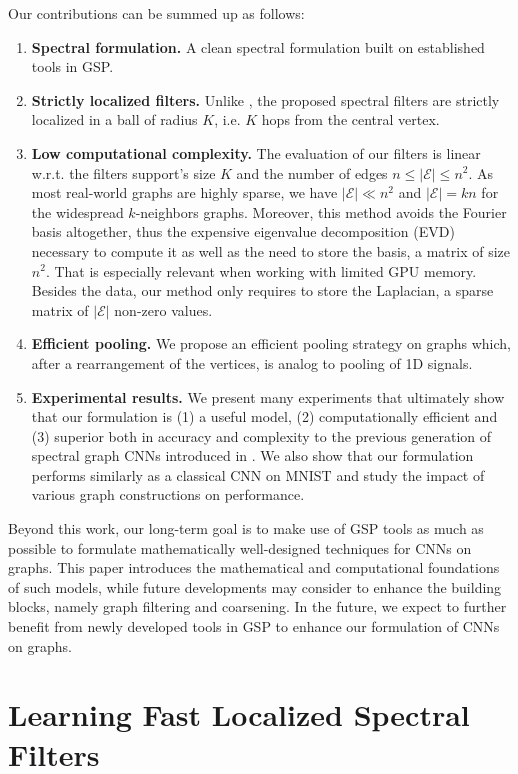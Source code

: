 \documentclass{article}
\newcommand{\E}{\mathcal{E}}
\newcommand{\bruna}{art:BrunaZarembaSzlamLeCun13DLgraphs,
art:HenaffBrunaLeCun15DLgraphs}
\begin{document}
Our contributions can be summed up as follows:
\begin{enumerate}
\item \textbf{Spectral formulation.} A clean spectral formulation built on
	established tools in GSP.
\item \textbf{Strictly localized filters.} Unlike \cite{\bruna}, the proposed spectral
	filters are strictly localized in a ball of radius $K$, i.e. $K$ hops from
	the central vertex.
\item \textbf{Low computational complexity.} The evaluation of our filters is
	linear w.r.t. the filters support's size $K$ and the number of edges $n \leq
	|\E| \leq n^2$. As most real-world graphs are highly sparse, we have $|\E|
	\ll n^2$ and $|\E| = kn$ for the widespread $k$-neighbors graphs. Moreover,
	this method avoids the Fourier basis altogether, thus the expensive
	eigenvalue decomposition (EVD) necessary to compute it as well as the need
	to store the basis, a matrix of size $n^2$. That is especially relevant when
	working with limited GPU memory. Besides the data, our method only requires
	to store the Laplacian, a sparse matrix of $|\E|$ non-zero values.
\item \textbf{Efficient pooling.} We propose an efficient pooling strategy on
	graphs which, after a rearrangement of the vertices, is analog to pooling of
	1D signals.
\item \textbf{Experimental results.} We present many experiments that ultimately
	show that our formulation is (1) a useful model, (2) computationally
	efficient and (3) superior both in accuracy and complexity to the previous
	generation of spectral graph CNNs introduced in \cite{\bruna}. We also show that
	our formulation performs similarly as a classical CNN on MNIST and study the
	impact of various graph constructions on performance.
\end{enumerate}

Beyond this work, our long-term goal is to make use of GSP tools as much as
possible to formulate mathematically well-designed techniques for CNNs on
graphs. This paper introduces the mathematical and computational foundations of
such models, while future developments may consider to enhance the building
blocks, namely graph filtering and coarsening. In the future, we expect to
further benefit from newly developed tools in GSP to enhance our formulation of
CNNs on graphs.

\section{Learning Fast Localized Spectral Filters} \label{sec:filters}
\end{document}

